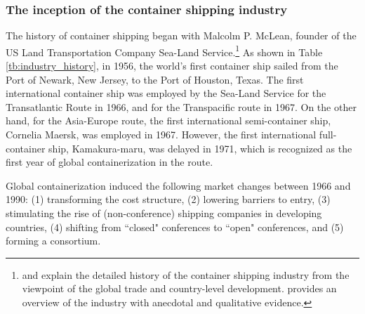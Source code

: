 \documentclass[11pt]{article}
\begin{document}


\subsubsection{The inception of the container shipping industry}\label{subsec:inception_of_container_shipping_industry}

The history of container shipping began with Malcolm P. McLean, founder of the US Land Transportation Company Sea-Land Service.\footnote{\cite{bernhofen2016estimating} and \cite{rua2014diffusion} explain the detailed history of the container shipping industry from the viewpoint of the global trade and country-level development. \cite{levinson2016box} provides an overview of the industry with anecdotal and qualitative evidence.}  As shown in Table \ref{tb:industry_history}, in 1956, the world's first container ship sailed from the Port of Newark, New Jersey, to the Port of Houston, Texas. The first international container ship was employed by the Sea-Land Service for the Transatlantic Route in 1966, and for the Transpacific route in 1967. On the other hand, for the Asia-Europe route, the first international semi-container ship, Cornelia Maersk, was employed in 1967. However, the first international full-container ship, Kamakura-maru, was delayed in 1971, which is recognized as the first year of global containerization in the route.

Global containerization induced the following market changes between 1966 and 1990: (1) transforming the cost structure, (2) lowering barriers to entry, (3) stimulating the rise of (non-conference) shipping companies in developing countries, (4) shifting from ``closed" conferences to ``open" conferences, and (5) forming a consortium.
\end{document}
